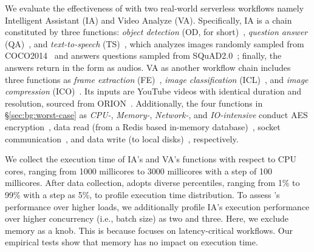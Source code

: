  We evaluate the effectiveness of \namex with two real-world serverless workflows namely Intelligent Assistant (IA) and Video Analyze (VA).
Specifically, IA is a chain constituted by three functions: \textit{object detection} (OD, for short)~\cite{object-detect}, \textit{question answer} (QA)~\cite{question-answer}, and \textit{text-to-speech} (TS)~\cite{text-to-speech}, which analyzes images randomly sampled from COCO2014~\cite{coco-dataset} and answers questions sampled from SQuAD2.0~\cite{qa-dataset}; finally, the answers return in the form as audios.
VA as another workflow chain includes three functions as \textit{frame extraction} (FE)~\cite{extract-frame}, \textit{image classification} (ICL)~\cite{image-classification}, and \textit{image compression} (ICO)~\cite{image-compression}.
Its inputs are YouTube videos with identical duration and resolution, sourced from ORION~\cite{osdi22-orion}.
Additionally, the four functions in \S\ref{sec:bg:worst-case} as \textit{CPU-}, \textit{Memory-}, \textit{Network-}, and \textit{IO-intensive} conduct AES encryption~\cite{isca22-lukewarm}, data read (from a Redis based in-memory database)~\cite{middleware21-sebs}, socket communication~\cite{middleware21-sebs}, and data write (to local disks)~\cite{atc18-peek-bench}, respectively.


We collect the execution time of IA's and VA's functions with respect to CPU cores, ranging from 1000 millicores to 3000 millicores with a step of 100 millicores.
After data collection, \namex adopts diverse percentiles, ranging from 1\% to 99\% with a step as 5\%, to profile execution time distribution.
To assess \namex's performance over higher loads, we additionally profile IA's execution performance over higher concurrency (i.e., batch size) as two and three.
Here, we exclude memory as a knob.
This is because \namex focuses on latency-critical workflows.
Our empirical tests show that memory has no impact on execution time.

